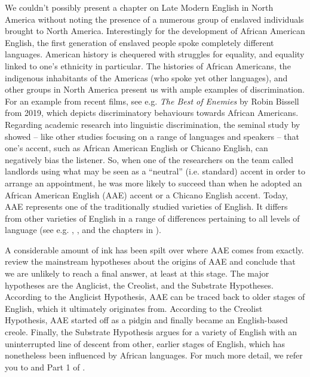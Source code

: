 We couldn't possibly present a chapter on Late Modern English in North America without noting the presence of a numerous group of enslaved individuals brought to North America. Interestingly for the development of African American English, the first generation of enslaved people spoke completely different languages. American history is chequered with struggles for equality, and equality linked to one's ethnicity in particular. The histories of African Americans, the indigenous inhabitants of the Americas (who spoke yet other languages), and other groups in North America present us with ample examples of discrimination. For an example from recent films, see e.g. \textit{The Best of Enemies} by Robin Bissell from 2019, which depicts discriminatory behaviours towards African Americans. Regarding academic research into linguistic discrimination, the seminal study by \citet{Purnelletal1990} showed -- like other studies focusing on a range of languages and speakers -- that one's accent, such as African American English or Chicano English, can negatively bias the listener. So, when one of the researchers on the team called landlords using what may be seen as a ``neutral'' (i.e. standard) accent in order to arrange an appointment, he was more likely to succeed than when he adopted an African American English (AAE) accent or a Chicano English accent. Today, AAE represents one of the traditionally studied varieties of English. It differs from other varieties of English in a range of differences pertaining to all levels of language (see e.g. \citealp{Green2002}, \citealp[Chapter 7]{WolframSchilling-Estes2015}, and the chapters in \citealp{Lanehart2015}).

A considerable amount of ink has been spilt over where AAE comes from exactly. \citet[§8.3]{WolframSchilling-Estes2015} review the mainstream hypotheses about the origins of AAE and conclude that we are unlikely to reach a final answer, at least at this stage. The major hypotheses are the Anglicist, the Creolist, and the Substrate Hypotheses. According to the Anglicist Hypothesis, AAE can be traced back to older stages of English, which it ultimately originates from. According to the Creolist Hypothesis, AAE started off as a pidgin and finally became an English-based creole. Finally, the Substrate Hypothesis argues for a variety of English with an uninterrupted line of descent from other, earlier stages of English, which has nonetheless been influenced by African languages. For much more detail, we refer you to \citet[Chapter 7]{WolframSchilling-Estes2015} and Part 1 of \citet{Lanehart2015}.  

